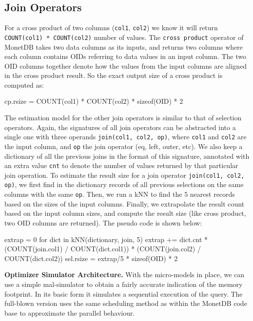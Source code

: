 \documentclass[conference]{IEEEtran}
\def\Skip{\par\medskip\nobreak\noindent}
\begin{document}
\subsection{Join Operators}
For a cross product of two columns (\texttt{\small col1}, \texttt{\small col2}) we know it will return \texttt{\small COUNT(col1) * COUNT(col2)} number of values.
The \texttt{\small cross product} operator of MonetDB takes two data columns as its inputs, and returns two columns where each column contains OIDs referring to data values in an input column.
The two OID columns together denote how the values from the input columns are aligned in the cross product result.
So the exact output size of a cross product is computed as:
\begin{verb}
cp.rsize = COUNT(col1) * COUNT(col2) * sizeof(OID) * 2
\end{verb}

The estimation model for the other join operators is similar to that of selection operators.
Again, the signatures of all join operators can be abstracted into a single one with three operands \texttt{\small join(col1, col2, op)}, where \texttt{\small col1} and \texttt{\small col2} are the input column, and \texttt{\small op} the join operator (eq, left, outer, etc).
We also keep a dictionary of all the previous joins in the format of this signature, annotated with an extra value \texttt{\small cnt} to denote the number of values returned by that particular join operation.
To estimate the result size for a join operator \texttt{\small join(col1, col2, op)}, we first find in the dictionary records of all previous selections on the same columns with the same \texttt{\small op}. 
Then, we run a kNN to find the 5 nearest records based on the sizes of the input columns.
Finally, we extrapolate the result count based on the input column sizes, and compute the result size (like cross product, two OID columns are returned).
The pseudo code is shown below:
\begin{verb}
extrap = 0
for dict in kNN(dictionary, join, 5)
  extrap += dict.cnt * (COUNT(join.col1) / COUNT(dict.col1)) *
                       (COUNT(join.col2) / COUNT(dict.col2))
sel.rsize = extrap/5 * sizeof(OID) * 2
\end{verb}

\Skip\textbf{Optimizer Simulator Architecture.}
With the micro-models in place, we can use a simple {\sc mal}-simulator to obtain a fairly accurate indication of the memory footprint.
In its basic form it simulates a sequential execution of the query.
The full-blown version uses the same scheduling method as within the MonetDB code base to approximate the parallel behaviour.
\end{document}
